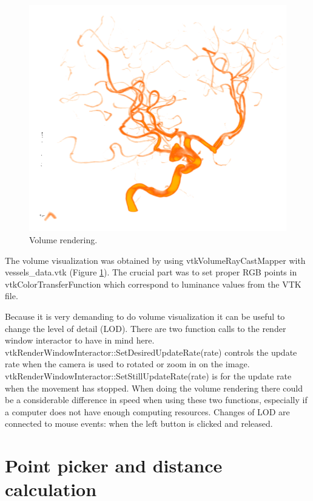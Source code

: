 \begin{figure}
	\centering
	\includegraphics[scale=0.4]{fig/volume-rendering}
	\caption{Volume rendering.}\label{fig:volume-rendering}
\end{figure}

The volume visualization was obtained by using vtkVolumeRayCastMapper with vessels\_data.vtk (Figure \ref{fig:volume-rendering}). The crucial part was to set proper RGB points in vtkColorTransferFunction which correspond to luminance values from the VTK file.

Because it is very demanding to do volume visualization it can be useful to change the level of detail (LOD). There are two function calls to the render window interactor to have in mind here. vtkRenderWindowInteractor::SetDesiredUpdateRate(rate) controls the update rate when the camera is used to rotated or zoom in on the image. vtkRenderWindowInteractor::SetStillUpdateRate(rate) is for the update rate when the movement has stopped. When doing the volume rendering there could be a considerable difference in speed when using these two functions, especially if a computer does not have enough computing resources. Changes of LOD are connected to mouse events: when the left button is clicked and released.

\section{Point picker and distance calculation}

